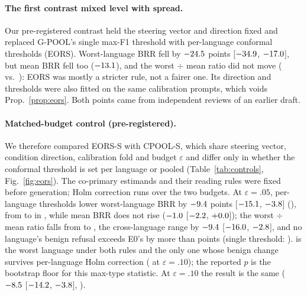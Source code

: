 \documentclass{article}
\newcommand{\ci}[2]{{\small[$#1$, $#2$]}}
\begin{document}
\paragraph{The first contrast mixed level with spread.} Our pre-registered contrast held the steering vector and direction fixed and replaced G-POOL's single max-F1 threshold with per-language conformal thresholds (EORS). Worst-language BRR fell by $-24.5$ points \ci{\EorsQMaxBrrLo}{\EorsQMaxBrrHi}, but mean BRR fell too ($-13.1$), and the worst $\div$ mean ratio did not move (\GpoolBrrRatio{} vs.\ \EorsBrrRatio): EORS was mostly a stricter rule, not a fairer one. Its direction and thresholds were also fitted on the same calibration prompts, which voids Prop.~\ref{prop:eors}. Both points came from independent reviews of an earlier draft.

\paragraph{Matched-budget control (pre-registered).} We therefore compared EORS-S with CPOOL-S, which share steering vector, condition direction, calibration fold and budget $\varepsilon$ and differ only in whether the conformal threshold is set per language or pooled (Table~\ref{tab:controls}, Fig.~\ref{fig:eors}). The co-primary estimands and their reading rules were fixed before generation; Holm correction runs over the two budgets.
At $\varepsilon{=}.05$, per-language thresholds lower worst-language BRR by $-9.4$ points \ci{\CtlFiveMaxBrrLo}{\CtlFiveMaxBrrHi} (\CtlFivePoneHolm), from \CtlFivePoolWorstBrr{} to \CtlFiveEorsWorstBrr{} in \CtlFivePoolWorstBrrLang, while mean BRR does not rise ($-1.0$ \ci{\CtlFiveMeanBrrLo}{\CtlFiveMeanBrrHi}); the worst $\div$ mean ratio falls from \CtlFivePoolRatio{} to \CtlFiveEorsRatio, the cross-language range by $-9.4$ \ci{\CtlFiveRangeLo}{\CtlFiveRangeHi}, and no language's benign refusal exceeds E0's by more than \CtlFiveEorsExcessMax{} points (single threshold: \CtlFivePoolExcessMax). \CtlFivePoolWorstBrrLang{} is the worst language under both rules and the only one whose benign change survives per-language Holm correction (\CtlTenHolmBenignLangs{} at $\varepsilon{=}.10$); the reported $p$ is the bootstrap floor for this max-type statistic. At $\varepsilon{=}.10$ the result is the same ($-8.5$ \ci{\CtlTenMaxBrrLo}{\CtlTenMaxBrrHi}, \CtlTenPoneHolm).
\end{document}
